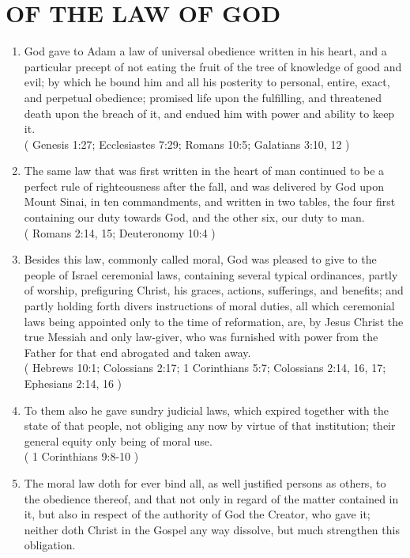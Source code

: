 \documentclass[12pt,a4paper]{book}
\begin{document}
\chapter{OF THE LAW OF GOD}
\label{ch-law-God}
\begin{enumerate}
\item
\label{ch-law-God-1}
God gave to Adam a law of universal obedience written in his heart, and a particular precept of not eating the fruit of the tree of knowledge of good and evil; by which he bound him and all his posterity to personal, entire, exact, and perpetual obedience; promised life upon the fulfilling, and threatened death upon the breach of it, and endued him with power and ability to keep it.\\
( Genesis 1:27; Ecclesiastes 7:29; Romans 10:5; Galatians 3:10, 12 )
\item
\label{ch-law-God-2}
The same law that was first written in the heart of man continued to be a perfect rule of righteousness after the fall, and was delivered by God upon Mount Sinai, in ten commandments, and written in two tables, the four first containing our duty towards God, and the other six, our duty to man.\\
( Romans 2:14, 15; Deuteronomy 10:4 )
\item
\label{ch-law-God-3}
Besides this law, commonly called moral, God was pleased to give to the people of Israel ceremonial laws, containing several typical ordinances, partly of worship, prefiguring Christ, his graces, actions, sufferings, and benefits; and partly holding forth divers instructions of moral duties, all which ceremonial laws being appointed only to the time of reformation, are, by Jesus Christ the true Messiah and only law-giver, who was furnished with power from the Father for that end abrogated and taken away.\\
( Hebrews 10:1; Colossians 2:17; 1 Corinthians 5:7; Colossians 2:14, 16, 17; Ephesians 2:14, 16 )
\item
\label{ch-law-God-4}
To them also he gave sundry judicial laws, which expired together with the state of that people, not obliging any now by virtue of that institution; their general equity only being of moral use.\\
( 1 Corinthians 9:8-10 )
\item
\label{ch-law-God-5}
The moral law doth for ever bind all, as well justified persons as others, to the obedience thereof, and that not only in regard of the matter contained in it, but also in respect of the authority of God the Creator, who gave it; neither doth Christ in the Gospel any way dissolve, but much strengthen this obligation.\\

\end{enumerate}
\end{document}
